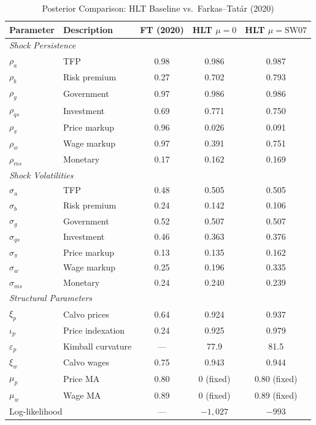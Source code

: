 \documentclass[12pt]{article}
\theoremstyle{plain}
\theoremstyle{definition}
\theoremstyle{remark}
\begin{document}
\begin{table}[htbp]
\centering
\caption{Posterior Comparison: HLT Baseline vs.\ Farkas--Tat\'ar (2020)}
\label{tab:ft_comparison}
\begin{tabular}{llccc}
\toprule
Parameter & Description & FT (2020) & HLT $\mu=0$ & HLT $\mu=\text{SW07}$ \\
\midrule
\multicolumn{5}{l}{\textit{Shock Persistence}} \\
$\rho_a$ & TFP & 0.98 & 0.986 & 0.987 \\
$\rho_b$ & Risk premium & 0.27 & 0.702 & 0.793 \\
$\rho_g$ & Government & 0.97 & 0.986 & 0.986 \\
$\rho_{qs}$ & Investment & 0.69 & 0.771 & 0.750 \\
$\rho_\pi$ & Price markup & 0.96 & 0.026 & 0.091 \\
$\rho_w$ & Wage markup & 0.97 & 0.391 & 0.751 \\
$\rho_{ms}$ & Monetary & 0.17 & 0.162 & 0.169 \\
\midrule
\multicolumn{5}{l}{\textit{Shock Volatilities}} \\
$\sigma_a$ & TFP & 0.48 & 0.505 & 0.505 \\
$\sigma_b$ & Risk premium & 0.24 & 0.142 & 0.106 \\
$\sigma_g$ & Government & 0.52 & 0.507 & 0.507 \\
$\sigma_{qs}$ & Investment & 0.46 & 0.363 & 0.376 \\
$\sigma_\pi$ & Price markup & 0.13 & 0.135 & 0.162 \\
$\sigma_w$ & Wage markup & 0.25 & 0.196 & 0.335 \\
$\sigma_{ms}$ & Monetary & 0.24 & 0.240 & 0.239 \\
\midrule
\multicolumn{5}{l}{\textit{Structural Parameters}} \\
$\xi_p$ & Calvo prices & 0.64 & 0.924 & 0.937 \\
$\iota_p$ & Price indexation & 0.24 & 0.925 & 0.979 \\
$\varepsilon_p$ & Kimball curvature & --- & 77.9 & 81.5 \\
$\xi_w$ & Calvo wages & 0.75 & 0.943 & 0.944 \\
\midrule
$\mu_p$ & Price MA & 0.80 & 0 (fixed) & 0.80 (fixed) \\
$\mu_w$ & Wage MA & 0.89 & 0 (fixed) & 0.89 (fixed) \\
\midrule
\multicolumn{2}{l}{Log-likelihood} & --- & $-1{,}027$ & $-993$ \\

\end{tabular}
\end{table}
\end{document}
